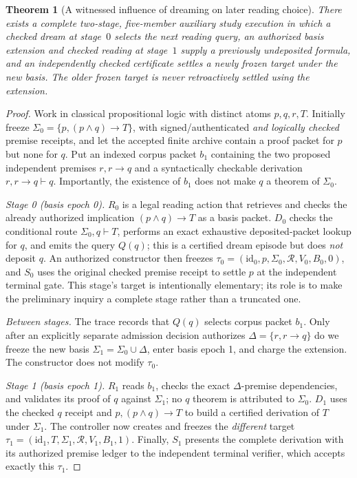 \documentclass[11pt]{article}
\newtheorem{theorem}{Theorem}[section]
\begin{document}
\begin{theorem}[A witnessed influence of dreaming on later reading choice]
There exists a complete two-stage, five-member auxiliary study execution in which a checked dream at stage~$0$ selects the next reading query, an authorized basis extension and checked reading at stage~$1$ supply a previously undeposited formula, and an independently checked certificate settles a \emph{newly frozen} target under the new basis. The older frozen target is never retroactively settled using the extension.
\end{theorem}
\begin{proof}
Work in classical propositional logic with distinct atoms $p,q,r,T$. Initially freeze $\Sigma_0=\{p,(p\land q)\to T\}$, with signed/authenticated \emph{and logically checked} premise receipts, and let the accepted finite archive contain a proof packet for $p$ but none for $q$. Put an indexed corpus packet $b_1$ containing the two proposed independent premises $r,r\to q$ and a syntactically checkable derivation $r,r\to q\vdash q$. Importantly, the existence of $b_1$ does not make $q$ a theorem of $\Sigma_0$.

\emph{Stage 0 (basis epoch 0).} $R_0$ is a legal reading action that retrieves and checks the already authorized implication $(p\land q)\to T$ as a basis packet. $D_0$ checks the conditional route $\Sigma_0,q\vdash T$, performs an exact exhaustive deposited-packet lookup for $q$, and emits the query $Q(q)$; this is a certified dream episode but does \emph{not} deposit $q$. An authorized constructor then freezes $\tau_0=(\mathrm{id}_0,p,\Sigma_0,\mathcal R,V_0,B_0,0)$, and $S_0$ uses the original checked premise receipt to settle $p$ at the independent terminal gate. This stage's target is intentionally elementary; its role is to make the preliminary inquiry a complete stage rather than a truncated one.

\emph{Between stages.} The trace records that $Q(q)$ selects corpus packet $b_1$. Only after an explicitly separate admission decision authorizes $\Delta=\{r,r\to q\}$ do we freeze the new basis $\Sigma_1=\Sigma_0\cup\Delta$, enter basis epoch 1, and charge the extension. The constructor does not modify $\tau_0$.

\emph{Stage 1 (basis epoch 1).} $R_1$ reads $b_1$, checks the exact $\Delta$-premise dependencies, and validates its proof of $q$ against $\Sigma_1$; no $q$ theorem is attributed to $\Sigma_0$. $D_1$ uses the checked $q$ receipt and $p,(p\land q)\to T$ to build a certified derivation of $T$ under $\Sigma_1$. The controller now creates and freezes the \emph{different} target $\tau_1=(\mathrm{id}_1,T,\Sigma_1,\mathcal R,V_1,B_1,1)$. Finally, $S_1$ presents the complete derivation with its authorized premise ledger to the independent terminal verifier, which accepts exactly this $\tau_1$.


\end{proof}
\end{document}
